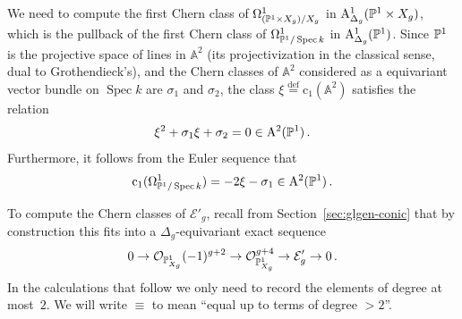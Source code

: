 \documentclass{amsart}
\numberwithin{equation}{section}
\numberwithin{subsection}{section}
\theoremstyle{definition}
\theoremstyle{remark}
\newcommand\cE{\mathcal{E}} \newcommand\cF{\mathcal{F}}
\newcommand\cO{\mathcal{O}} \newcommand\cP{\mathcal{P}}
\renewcommand\AA{\mathbb{A}} \newcommand\BB{\mathbb{B}}
\newcommand\rA{\mathrm{A}} \newcommand\rB{\mathrm{B}}
\newcommand\rmc{\mathrm{c}} \newcommand\rmd{\mathrm{d}}
\newcommand\arr{\ifinner\to\else\longrightarrow\fi}
\newcommand\eqdef{\overset{\mathrm{\scriptscriptstyle def}} =}
\newcommand\spec{\operatorname{Spec}}
\begin{document}
We need to compute the first Chern class of $\Omega^{1}_{(\mathbb{P}^{1}\times X_{g})/X_{g}}$ in $\rA^{1}_{\Delta_{g}}(\PP^{1}\times X_{g})$, which is the pullback of the first Chern class of $\Omega^{1}_{\PP^{1}/\spec k}$ in $\rA^{1}_{\Delta_{g}}(\PP^{1})$. Since $\mathbb{P}^{1}$ is the projective space of lines in $\AA^{2}$ (its projectivization in the classical sense, dual to Grothendieck's), and the Chern classes of $\AA^{2}$ considered as a equivariant vector bundle on $\spec k$ are $\sigma_{1}$ and $\sigma_{2}$, the class $\xi \eqdef \rmc_{1}(\AA^{2})$ satisfies the relation
\begin{equation}\label{eq:class-xi}
\xi^{2} + \sigma_{1}\xi + \sigma_{2} = 0\in \rA^{2}(\PP^{1})\,.
\end{equation}
Furthermore, it follows from the Euler sequence that
\begin{equation}\label{eq:class-omega}
\rmc_{1}(\Omega^{1}_{\PP^{1}/\spec k}) = -2\xi - \sigma_{1} \in \rA^{2}(\PP^{1})\,.
\end{equation}

To compute the Chern classes of $\cE'_{g}$, recall from Section~\ref{sec:glgen-conic} that by construction this fits into a $\Delta_{g}$-equivariant exact sequence
   \[
   0 \arr \cO_{\PP^1_{X_{g}}}(-1)^{g+2} \arr \cO_{\PP^1_{X_{g}}}^{g+4} \arr \cE_g' \arr 0\,.
   \]
In the calculations that follow we only need to record the elements of degree at most~$2$. We will write $\equiv$ to mean ``equal up to terms of degree $> 2$''.
\end{document}
